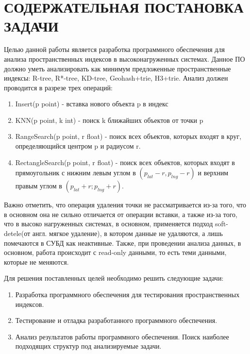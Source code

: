 \chapter{СОДЕРЖАТЕЛЬНАЯ ПОСТАНОВКА ЗАДАЧИ}
\label{cha:statement}

Целью данной работы является разработка программного обеспечения для анализа пространственных индексов в высоконагруженных системах. Данное ПО должно уметь анализировать как минимум предложенные пространственные индексы: R-tree, R*-tree, KD-tree, Geohash+trie, H3+trie. Анализ должен проводится в разрезе трех операций:
\begin{enumerate}
    \item  Insert(p point) - вставка нового объекта p в индекс
    \item  KNN(p point, k int) - поиск k ближайших объектов от точки p
    \item  RangeSearch(p point, r float) - поиск всех объектов, которых входят в круг, определяющийся центром p и радиусом r.
    \item  RectangleSearch(p point, r float) - поиск всех объектов, которых входят в прямоугольник с нижним левым углом в $(p_{lat} - r, p_{lng} - r)$ и верхним правым углом в  $(p_{lat} + r; p_{lng} + r)$.
\end{enumerate}

Важно отметить, что операция удаления точки не рассматривается из-за того, что в основном она не сильно отличается от операции вставки, а также из-за того, что в высоко нагруженных системах, в основном, применяется подход soft-detele(от англ. мягкое удаление), в котором данные не удаляются, а лишь помечаются в СУБД как неактивные. Также, при проведении анализа данных, в основном, работа происходит с read-only данными, то есть теми данными, которые не меняются.

Для решения поставленных целей необходимо решить следующие задачи:
\begin{enumerate}
    \item  Разработка программного обеспечения для тестирования пространственных индексов.
    \item  Тестирование и отладка разработанного программного обеспечения.
    \item  Анализ результатов работы программного обеспечения. Поиск наиболее подходящих структур под анализируемые задачи.
\end{enumerate}
